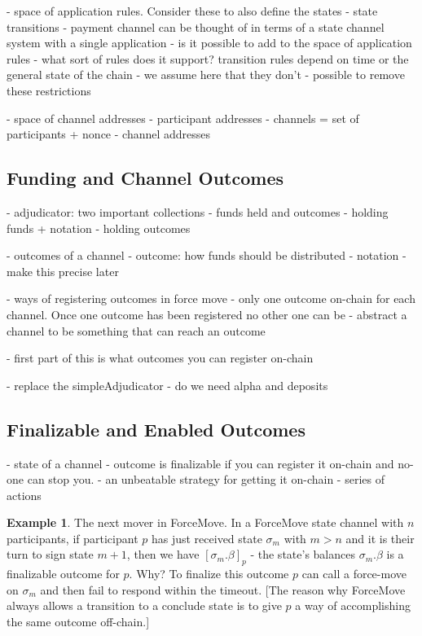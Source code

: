 \documentclass{article}
\theoremstyle{definition}
\newtheorem{example}{Example}[section]
\newcommand{\enf}[1]{[#1]}
\begin{document}
- space of application rules. Consider these to also define the states
- state transitions
- payment channel can be thought of in terms of a state channel system with a single application
- is it possible to add to the space of application rules
- what sort of rules does it support? transition rules depend on time or the general state of the chain
- we assume here that they don't
- possible to remove these restrictions

- space of channel addresses
- participant addresses
- channels = set of participants + nonce
- channel addresses

\subsection{Funding and Channel Outcomes}

- adjudicator: two important collections - funds held and outcomes
- holding funds + notation
- holding outcomes

- outcomes of a channel
- outcome: how funds should be distributed
- notation
- make this precise later


- ways of registering outcomes in force move
- only one outcome on-chain for each channel. Once one outcome has been registered no other one can be
- abstract a channel to be something that can reach an outcome

- first part of this is what outcomes you can register on-chain

- replace the simpleAdjudicator
- do we need alpha and deposits

\subsection{Finalizable and Enabled Outcomes}

- state of a channel
- outcome is finalizable if you can register it on-chain and no-one can stop you.
- an unbeatable strategy for getting it on-chain
- series of actions

\begin{example}{The next mover in ForceMove.}
  In a ForceMove state channel with $n$ participants, if participant $p$ has just received state $\sigma_m$ with $m > n$ and it is their turn to sign state $m+1$, then we have $\enf{\sigma_m.\beta}_p$ - the state's balances $\sigma_m.\beta$ is a finalizable outcome for $p$.
  Why? To finalize this outcome $p$ can call a force-move on $\sigma_m$ and then fail to respond within
  the timeout. [The reason why ForceMove always allows a transition to a conclude state is to
  give $p$ a way of accomplishing the same outcome off-chain.]
\end{example}
\end{document}
